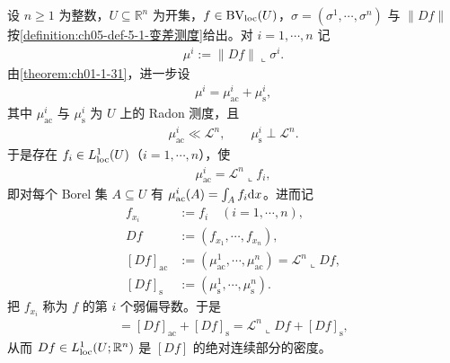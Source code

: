 \documentclass[../../main.tex]{subfiles}%
\begin{document}
\begin{definition*}\label{definition:ch05-def-5-1-测度分解}
设 $n\geqslant1$ 为整数，$U\subseteq\mathbb{R}^n$ 为开集，$f\in\mathrm{BV}_{\mathrm{loc}}(U)$，$\sigma=(\sigma^1,\cdots,\sigma^n)$ 与 $\lVert Df\rVert$ 按\cref{definition:ch05-def-5-1-变差测度}给出。对 $i=1,\cdots,n$ 记 %
\begin{align*}
\mu^i:=\lVert Df\rVert\llcorner\sigma^i .
\end{align*}
由\cref{theorem:ch01-1-31}，进一步设 %
\begin{align*}
\mu^i=\mu^i_{\mathrm{ac}}+\mu^i_{\mathrm{s}},
\end{align*}
其中 $\mu^i_{\mathrm{ac}}$ 与 $\mu^i_{\mathrm{s}}$ 为 $U$ 上的 Radon 测度，且
\begin{align*}
\mu^i_{\mathrm{ac}}\ll\mathcal{L}^n,\qquad \mu^i_{\mathrm{s}}\perp\mathcal{L}^n .
\end{align*}
于是存在 $f_i\in L^1_{\mathrm{loc}}(U)$（$i=1,\cdots,n$），使
\begin{align*}
\mu^i_{\mathrm{ac}}=\mathcal{L}^n\llcorner f_i,
\end{align*}
即对每个 Borel 集 $A\subseteq U$ 有 $\mu^i_{\mathrm{ac}}(A)=\int_A f_i\mathrm{d} x$。进而记
\begin{align*}
f_{x_i}&:=f_i\quad(i=1,\cdots,n),\\
Df&:=(f_{x_1},\cdots,f_{x_n}),\\
[Df]_{\mathrm{ac}}&:=(\mu^1_{\mathrm{ac}},\cdots,\mu^n_{\mathrm{ac}})=\mathcal{L}^n\llcorner Df,\\
[Df]_{\mathrm{s}}&:=(\mu^1_{\mathrm{s}},\cdots,\mu^n_{\mathrm{s}}).
\end{align*}
把 $f_{x_i}$ 称为 $f$ 的第 $i$ 个弱偏导数。于是
\begin{align*}
[Df]=[Df]_{\mathrm{ac}}+[Df]_{\mathrm{s}}=\mathcal{L}^n\llcorner Df+[Df]_{\mathrm{s}},
\end{align*}
从而 $Df\in L^1_{\mathrm{loc}}(U;\mathbb{R}^n)$ 是 $[Df]$ 的绝对连续部分的密度。
\end{definition*}
\end{document}
